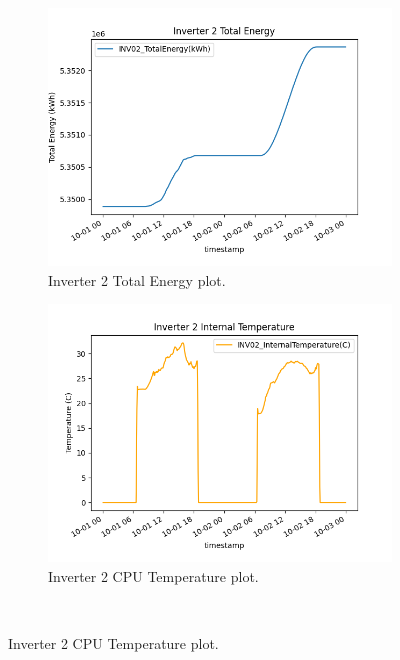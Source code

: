 \begin{figure}[H]
	\centering
	\begin{subfigure}[t]{0.45\textwidth}
		\centering
		\includegraphics[width=\textwidth, keepaspectratio]{chapters/1_introduction/imgs/inv2totenergy.png}
		\caption{Inverter 2 Total Energy plot.}
		\label{fig:inv02totenergy}
	\end{subfigure}
	\hspace{0.5cm}
	\begin{subfigure}[t]{0.45\textwidth}
		\centering
		\includegraphics[width=\textwidth, keepaspectratio]{chapters/1_introduction/imgs/inv2temperature.png}
		\caption{Inverter 2 CPU Temperature plot.}
		\label{fig:inv02temp}
	\end{subfigure}\\


\end{figure}
